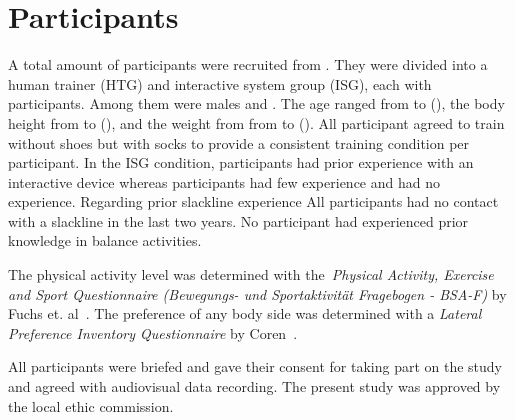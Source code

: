\section{Participants}
A total amount of  participants were recruited from . They were divided into a human trainer (HTG) and interactive system group (ISG), each with  participants. Among them  were males and . The age ranged from  to  (), the body height from  to  (), and the weight from from  to  (). All participant agreed to train without shoes but with socks to provide a consistent training condition per participant.
In the ISG condition,  participants had prior experience with an interactive device whereas  participants had few experience and  had no experience. Regarding prior slackline experience  All participants had no contact with a slackline in the last two years. No participant had experienced prior knowledge in balance activities. 

The physical activity level was determined with the~\textit{Physical Activity, Exercise and Sport Questionnaire (Bewegungs- und Sportaktivität Fragebogen - BSA-F)} by Fuchs et. al~\cite{Fuchs2015-bsa}. 
The preference of any body side was determined with a \textit{Lateral Preference Inventory Questionnaire} by Coren~\cite{Coren1993-lp}. 
 
All participants were briefed and gave their consent for taking part on the study and agreed with audiovisual data recording. The present study was approved by the local ethic commission.


